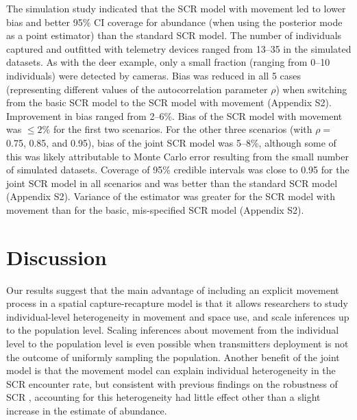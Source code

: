 \documentclass[12pt]{article}
\begin{document}
The simulation study indicated that the SCR model with movement led to
lower bias and better 95\% CI coverage for abundance (when using the
posterior mode as a point estimator) than the standard SCR model.
The number of individuals captured and outfitted with telemetry
devices ranged from 13--35 in the simulated datasets. As with the deer
example, only a small fraction (ranging from 0--10 individuals) were
detected by cameras. Bias was reduced in all 5 cases (representing different
values of the autocorrelation parameter $\rho$) when switching from
the basic SCR model to the SCR model with movement (Appendix
S2). Improvement in bias ranged from 2--6\%. Bias of the SCR model
with movement was $\le2\%$ for the first two
scenarios. For the other three scenarios (with 
$\rho=$0.75, 0.85, and 0.95), bias of the joint SCR model was
5--8\%, although some of this was likely attributable to Monte Carlo
error resulting from the small number of simulated datasets.
Coverage of 95\% credible intervals was close to 0.95 for
the joint SCR model in all scenarios and was better than the standard
SCR model (Appendix S2). Variance of the estimator was greater for the
SCR model with movement than for the basic, mis-specified SCR model
(Appendix S2).


\section{Discussion}


Our results suggest that the main advantage of including an explicit
movement process in a spatial capture-recapture model is that it
allows researchers to study individual-level heterogeneity in movement
and space use, and scale inferences up to the population
level. Scaling inferences about movement from the individual level to
the population level is even possible when transmitters deployment is
not the outcome of uniformly sampling the population. Another benefit
of the joint model is that the movement model can explain individual
heterogeneity in the SCR encounter rate, but consistent with previous
findings on the robustness of SCR
\citep{efford_mowat:2014,royle_etal:2016}, 
accounting for this heterogeneity had little effect other than a
slight increase in the estimate of abundance. 
\end{document}

